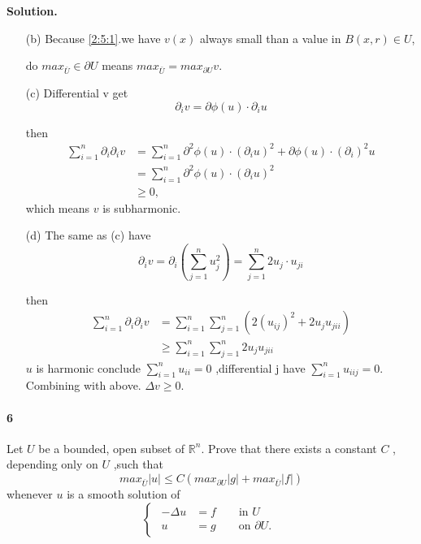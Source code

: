 \documentclass[a4paper]{book}
\newenvironment{solution}%
{\noindent\textbf{Solution.}}%
{\qedhere}
\numberwithin{equation}{chapter}
\theoremstyle{definition}
\begin{document}
\begin{multicols}{2}
\begin{solution}
\begin{itemize}
		\item[(b)] Because \ref{2:5:1}.we have $v(x)$ always small than a value in $B(x,r) \in U$,
		
		do $max_{\bar{U}} \in \partial U$ means $max_{\bar{U}} = max_{\partial U} v. $
		
		\item[(c)] Differential v get
		$$ \partial_i v = \partial \phi(u) \cdot \partial_i u $$
		
		then 
		\begin{equation}
			\begin{aligned}
			\sum_{i = 1}^{n} \partial_i \partial_i v &=\sum_{i = 1}^{n} \partial^2 \phi(u) \cdot (\partial_i u)^2 + \partial \phi(u) \cdot (\partial_i)^2 u \\ 
			&=\sum_{i = 1}^{n} \partial^2 \phi(u) \cdot (\partial_i u)^2 \\
			&\geq 0 ,
			\end{aligned}
		\end{equation}
		which means $v$ is subharmonic.
		
		\item[(d)]The same as (c) have
		$$ \partial_i v = \partial_i(\sum_{j = 1}^{n} u_j^2) = \sum_{j = 1}^{n} 2u_j \cdot u_{ji} $$
		
		then 
		\begin{equation}
			\begin{aligned}
				\sum_{i = 1}^{n} \partial_i \partial_i v &= \sum_{i = 1}^n \sum_{j = 1}^n(2(u_{ij})^2 + 2u_ju_{jii}) \\
				&\geq \sum_{i = 1}^n \sum_{j = 1}^n 2u_j u_{jii}
			\end{aligned}
		\end{equation}
		$u$ is harmonic conclude $ \sum_{i = 1}^{n} u_{ii} = 0 $ ,differential j have $ \sum_{i = 1}^{n} u_{iij} = 0 $. Combining with above. $\Delta v \geq 0$.
	\end{itemize}
\end{solution}


\paragraph{6}
Let $U$ be a bounded, open subset of $\mathbb{R}^n$. Prove that there exists a constant $C$ , depending only on $U$ ,such that 
\begin{equation}\label{2:6:1}
	max_{\bar{U}} |u| \leq C(max_{\partial U} |g| + max_{\bar{U}} |f|)
\end{equation}
whenever $u$ is a smooth solution of 
\begin{equation}\label{2:6:2}
	\begin{cases}
	\begin{aligned}
	-\Delta u &= f \qquad \text{in } U\\
	u &= g \qquad \text{on } \partial U.
	\end{aligned}
	\end{cases}
\end{equation}


\end{multicols}
\end{document}
